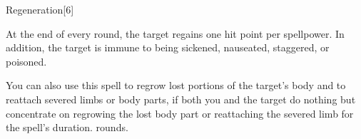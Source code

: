 \begin{spellsection}{Regeneration}[6]
    \begin{spellheader}
    \end{spellheader}
    \begin{spellcontent}
        \begin{spelltargetinginfo}
        \end{spelltargetinginfo}
        \begin{spelleffects}
            \spelleffect At the end of every round, the target regains one hit point per spellpower. In addition, the target is immune to being sickened, nauseated, staggered, or poisoned.

            \par You can also use this spell to regrow lost portions of the target's body and to reattach severed limbs or body parts, if both you and the target do nothing but concentrate on regrowing the lost body part or reattaching the severed limb for the spell's duration.
             rounds.
        \end{spelleffects}
    \end{spellcontent}
    \begin{spellfooter}
        \miscastexplode
    \end{spellfooter}
\end{spellsection}

